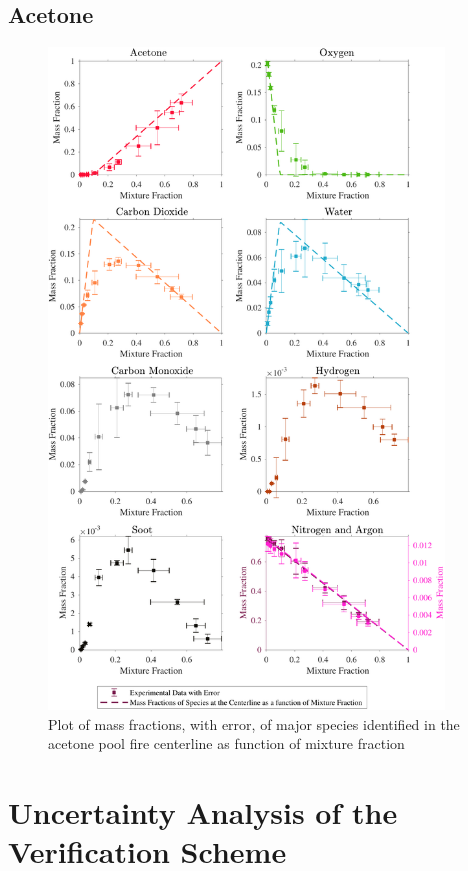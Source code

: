 \documentclass[12pt]{article}
\begin{document}
\subsection{Acetone}
\label{ssec:Acetone_ALL_Mix_Frac}
\begin{figure}[!h]
	\centering
\includegraphics[width=10.5cm,keepaspectratio]{Acetone_Mixture_Fraction_Major_Plot.pdf}
	\caption[Species mass fractions superimposed on acetone state relations]{Plot of mass fractions, with error, of major species identified in the acetone pool fire centerline as function of mixture fraction}
	\label{fig:Acetone_MIX_Frac_Major}
\end{figure}

\pagebreak

\section{Uncertainty Analysis of the Verification Scheme}\label{sec:Uncertainty_Ver_Scheme}
\end{document}
